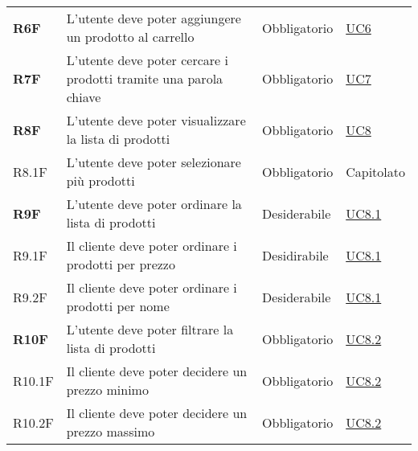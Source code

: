 \begin{center}
\begin{longtable}[!h]{p{50px} p{210px} p{80px} p{50px}}
        \textbf{R6F}                          & L'utente deve poter aggiungere un prodotto al carrello                                              & Obbligatorio             & \hyperref[sec:UC6]{UC6}                      \\
        \textbf{R7F}                          & L'utente deve poter cercare i prodotti tramite una parola chiave                                    & Obbligatorio             & \hyperref[sec:UC7]{UC7}                      \\
        \textbf{R8F}                          & L'utente deve poter visualizzare la lista di prodotti                                               & Obbligatorio             & \hyperref[sec:UC8]{UC8}                      \\
        R8.1F                                 & L'utente deve poter selezionare più prodotti                                                        & Obbligatorio             & Capitolato                                   \\
        \textbf{R9F}                          & L'utente deve poter ordinare la lista di prodotti                                                   & Desiderabile             & \hyperref[sec:UC8.1]{UC8.1}                  \\
        R9.1F                                 & Il cliente deve poter ordinare i prodotti per prezzo                                                & Desidirabile             & \hyperref[sec:UC8.1]{UC8.1}                  \\
        R9.2F                                 & Il cliente deve poter ordinare i prodotti per nome                                                  & Desiderabile             & \hyperref[sec:UC8.1]{UC8.1}                  \\
        \textbf{R10F}                         & L'utente deve poter filtrare la lista di prodotti                                                   & Obbligatorio             & \hyperref[sec:UC8.2]{UC8.2}                  \\
        R10.1F                                & Il cliente deve poter decidere un prezzo minimo                                                     & Obbligatorio             & \hyperref[sec:UC8.2]{UC8.2}                  \\
        R10.2F                                & Il cliente deve poter decidere un prezzo massimo                                                    & Obbligatorio             & \hyperref[sec:UC8.2]{UC8.2}                  \\

\end{longtable}
\end{center}
